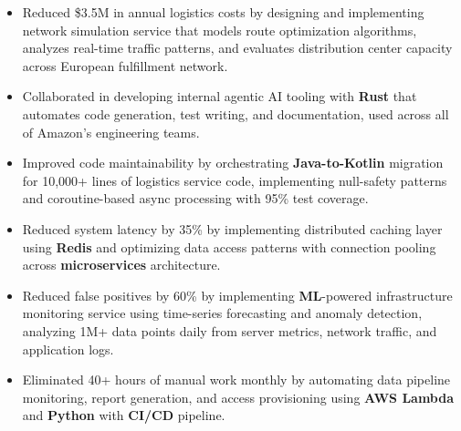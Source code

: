 \documentclass[10pt,a4paper]{article}
\begin{document}




\vspace{0.15em}

\begin{itemize}[topsep=0pt]
  \item Reduced \$3.5M in annual logistics costs by designing and implementing network simulation service that models route optimization algorithms, analyzes real-time traffic patterns, and evaluates distribution center capacity across European fulfillment network.
  \item Collaborated in developing internal agentic AI tooling with \textbf{Rust} that automates code generation, test writing, and documentation, used across all of Amazon's engineering teams.
  \item Improved code maintainability by orchestrating \textbf{Java-to-Kotlin} migration for 10,000+ lines of logistics service code, implementing null-safety patterns and coroutine-based async processing with 95\% test coverage.
  \item Reduced system latency by 35\% by implementing distributed caching layer using \textbf{Redis} and optimizing data access patterns with connection pooling across \textbf{microservices} architecture.
\end{itemize}
\vspace{0.15em}

\begin{itemize}[topsep=0pt]
  \item Reduced false positives by 60\% by implementing \textbf{ML}-powered infrastructure monitoring service using time-series forecasting and anomaly detection, analyzing 1M+ data points daily from server metrics, network traffic, and application logs.
  \item Eliminated 40+ hours of manual work monthly by automating data pipeline monitoring, report generation, and access provisioning using \textbf{AWS Lambda} and \textbf{Python} with \textbf{CI/CD} pipeline.
\end{itemize}
\vspace{0.15em}


\vspace{0.15em}






\end{document}

